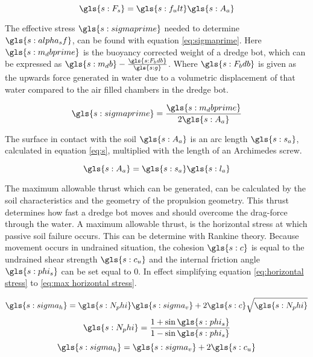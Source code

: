 \begin{sBox}
	\begin{equation}\label{eq:total skin friction}
		\gls{s:F_s} = \gls{s:f_ult} \gls{s:A_a}
	\end{equation}
\end{sBox}

\noindent The effective stress $ \gls{s:sigmaprime} $ needed to determine  $ \gls{s:alpha_sf} $, can be found with equation \ref{eq:sigmaprime}. Here $ \gls{s:m_dbprime} $ is the buoyancy corrected weight of a dredge bot, which can be expressed as $ \gls{s:m_db} - \frac{\gls{s:F_bdb}}{\gls{s:g}} $. Where $ \gls{s:F_bdb} $ is given as the upwards force generated in water due to a volumetric displacement of that water compared to the air filled chambers in the dredge bot.
\begin{sBox}
	\begin{equation}\label{eq:sigmaprime}
		\gls{s:sigmaprime} = \frac{\gls{s:m_dbprime}}{2 \gls{s:A_a}}
	\end{equation}
\end{sBox}

\noindent The surface in contact with the soil $ \gls{s:A_a} $ is an arc length $ \gls{s:s_a} $, calculated in equation \ref{eq:s}, multiplied with the length of an Archimedes screw.

\begin{sBox}
	\begin{equation}\label{eq:contact surface}
		\gls{s:A_a} = \gls{s:s_a} \gls{s:l_a}
	\end{equation}
\end{sBox}

The maximum allowable thrust which can be generated, can be calculated by the soil characteristics and the geometry of the propulsion geometry. This thrust determines how fast a dredge bot moves and should overcome the drag-force through the water. A maximum allowable thrust, is the horizontal stress at which passive soil failure occurs. This can be determine with Rankine theory. Because movement occurs in undrained situation, the cohesion $ \gls{s:c} $ is equal to the undrained shear strength $ \gls{s:c_u} $ and the internal friction angle $ \gls{s:phi_s} $ can be set equal to 0. In effect simplifying equation \ref{eq:horizontal stress} to \ref{eq:max horizontal stress}.

\begin{sBox}
	\begin{equation}\label{eq:horizontal stress}
		\gls{s:sigma_h} = \gls{s:N_phi} \gls{s:sigma_v} + 2\gls{s:c}\sqrt{\gls{s:N_phi}}
	\end{equation}
	\begin{equation}
		\gls{s:N_phi} = \frac{1 + \sin \gls{s:phi_s}}{1 - \sin \gls{s:phi_s}}
	\end{equation}
	\begin{equation}\label{eq:max horizontal stress}
		\gls{s:sigma_h} = \gls{s:sigma_v} + 2\gls{s:c_u}
	\end{equation}
\end{sBox}

